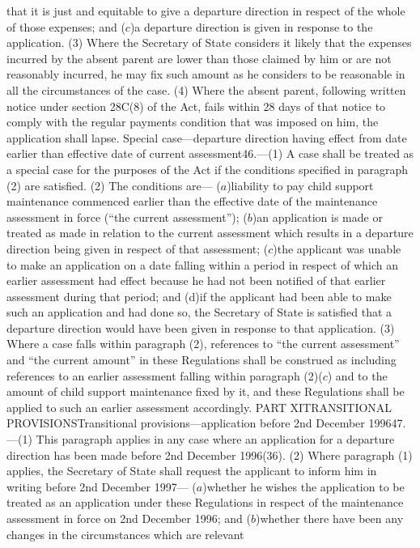 \documentclass[a4paper]{article}
\begin{document}
that it is just and equitable to give a departure direction in respect of the
whole of those expenses; and
($c$)a departure direction is given in response to the application.
(3) Where the Secretary of State considers it likely that the expenses incurred
by the absent parent are lower than those claimed by him or are not reasonably
incurred, he may fix such amount as he considers to be reasonable in all the
circumstances of the case.
(4) Where the absent parent, following written notice under section 28C(8) of
the Act, fails within 28 days of that notice to comply with the regular payments
condition that was imposed on him, the application shall lapse.
Special case—departure direction having effect from date earlier than effective
date of current assessment46.—(1) A case shall be treated as a special case for
the purposes of the Act if the conditions specified in paragraph (2) are
satisfied.
(2) The conditions are—
($a$)liability to pay child support maintenance commenced earlier than the
effective date of the maintenance assessment in force (“the current
assessment”);
($b$)an application is made or treated as made in relation to the current
assessment which results in a departure direction being given in respect of that
assessment;
($c$)the applicant was unable to make an application on a date falling within a
period in respect of which an earlier assessment had effect because he had not
been notified of that earlier assessment during that period; and
(d)if the applicant had been able to make such an application and had done so,
the Secretary of State is satisfied that a departure direction would have been
given in response to that application.
(3) Where a case falls within paragraph (2), references to “the current
assessment” and “the current amount” in these Regulations shall be construed as
including references to an earlier assessment falling within paragraph (2)($c$)
and to the amount of child support maintenance fixed by it, and these
Regulations shall be applied to such an earlier assessment accordingly.
PART XITRANSITIONAL PROVISIONSTransitional provisions—application before 2nd
December 199647.—(1) This paragraph applies in any case where an application for
a departure direction has been made before 2nd December 1996(36).
(2) Where paragraph (1) applies, the Secretary of State shall request the
applicant to inform him in writing before 2nd December 1997—
($a$)whether he wishes the application to be treated as an application under these
Regulations in respect of the maintenance assessment in force on 2nd December
1996; and
($b$)whether there have been any changes in the circumstances which are relevant
\end{document}
